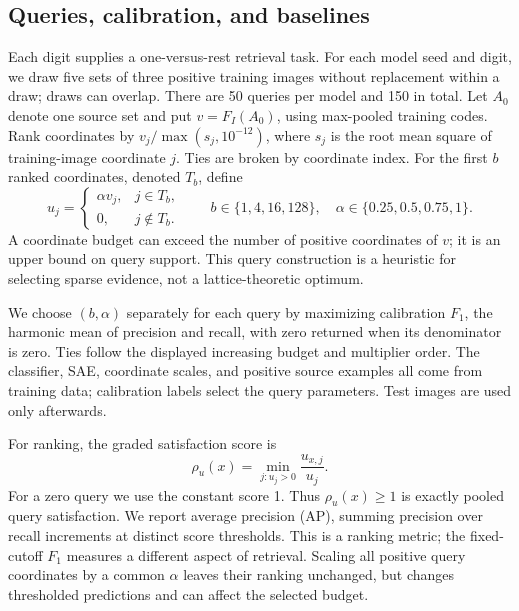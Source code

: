 \subsection{Queries, calibration, and baselines}
\label{sub:query-protocol}
Each digit supplies a one-versus-rest retrieval task. For each model seed
and digit, we draw five sets of three positive training images without
replacement within a draw; draws can overlap. There are 50 queries per
model and 150 in total. Let $A_{0}$ denote one source set and put
$v=F_{I}(A_{0})$, using max-pooled training codes. Rank coordinates by
$v_{j}/\max(s_{j},10^{-12})$, where $s_{j}$ is the root mean square of
training-image coordinate $j$. Ties are broken by coordinate index.
For the first $b$ ranked coordinates, denoted $T_{b}$, define
\begin{equation}\label{eq:budget-query}
      u_{j}=\begin{cases}
            \alpha v_{j}, & j\in T_{b},    \\
            0,            & j\notin T_{b}.
      \end{cases}
      \qquad
      b\in\{1,4,16,128\},\quad
      \alpha\in\{0.25,0.5,0.75,1\}.
\end{equation}
A coordinate budget can exceed the number of positive coordinates of
$v$; it is an upper bound on query support. This query construction is a
heuristic for selecting sparse evidence, not a lattice-theoretic optimum.

We choose $(b,\alpha)$ separately for each query by maximizing calibration
$F_{1}$, the harmonic mean of precision and recall, with zero returned
when its denominator is zero. Ties follow the displayed increasing
budget and multiplier order. The classifier, SAE, coordinate scales,
and positive source examples all come from training data; calibration
labels select the query parameters. Test images are used only afterwards.

For ranking, the graded satisfaction score is
\begin{equation}\label{eq:graded-score}
      \rho_{u}(x)=\min_{j:u_{j}>0}\frac{u_{x,j}}{u_{j}}.
\end{equation}
For a zero query we use the constant score 1. Thus
$\rho_{u}(x)\geq1$ is exactly pooled query satisfaction. We report average
precision (AP), summing precision over recall increments at distinct
score thresholds. This is a ranking metric; the fixed-cutoff $F_{1}$
measures a different aspect of retrieval. Scaling all positive query
coordinates by a common $\alpha$ leaves their ranking unchanged, but
changes thresholded predictions and can affect the selected budget.

